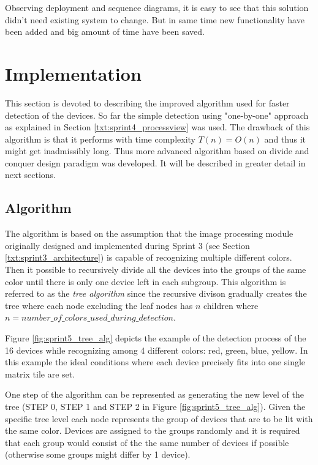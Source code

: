 Observing deployment and sequence diagrams, it is easy to see that this solution didn't need existing system to change. But in same time new functionality have been added and big amount of time have been saved.

\section{Implementation} \label{txt:sprint5_immplementation}
This section is devoted to describing the improved algorithm used for faster detection of the devices. So far the simple detection using "one-by-one" approach as explained in Section \ref{txt:sprint4_processview} was used. The drawback of this algorithm is that it performs with time complexity $T(n) = O(n)$ and thus it might get inadmissibly long. Thus more advanced algorithm based on divide and conquer design paradigm was developed. It will be described in greater detail in next sections.

\subsection{Algorithm}
The algorithm is based on the assumption that the image processing module originally designed and implemented during Sprint 3 (see Section \ref{txt:sprint3_architecture}) is capable of recognizing multiple different colors. Then it possible to recursively divide all the devices into the groups of the same color until there is only one device left in each subgroup. This algorithm is referred to as the \textit{tree algorithm} since the recursive divison gradually creates the tree where each node excluding the leaf nodes has $n$ children where $n = number\_of\_colors\_used\_during\_detection$.

Figure \ref{fig:sprint5_tree_alg} depicts the example of the detection process of the 16 devices while recognizing among 4 different colors: red, green, blue, yellow. In this example the ideal conditions where each device precisely fits into one single matrix tile are set. 

One step of the algorithm can be represented as generating the new level of the tree (STEP 0, STEP 1 and STEP 2 in Figure \ref{fig:sprint5_tree_alg}). Given the specific tree level each node represents the group of devices that are to be lit with the same color. Devices are assigned to the groups randomly and it is required that each group would consist of the the same number of devices if possible (otherwise some groups might differ by 1 device).

